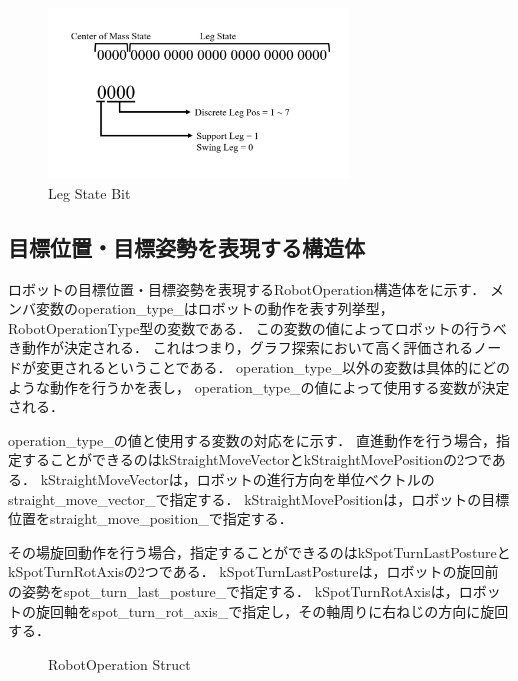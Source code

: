 \begin{figure}[htbp]
  \begin{center}
    \includegraphics[width=80mm, clip]{figure/chapter3/leg_state.png}
    \caption{Leg State Bit}
    \label{fig:leg_state_bit} %
  \end{center}
\end{figure}

\subsection{目標位置・目標姿勢を表現する構造体}
ロボットの目標位置・目標姿勢を表現するRobotOperation構造体をに示す．
メンバ変数のoperation\_type\_はロボットの動作を表す列挙型，RobotOperationType型の変数である．
この変数の値によってロボットの行うべき動作が決定される．
これはつまり，グラフ探索において高く評価されるノードが変更されるということである．
operation\_type\_以外の変数は具体的にどのような動作を行うかを表し，
operation\_type\_の値によって使用する変数が決定される．

operation\_type\_の値と使用する変数の対応をに示す．
直進動作を行う場合，指定することができるのはkStraightMoveVectorとkStraightMovePositionの2つである．
kStraightMoveVectorは，ロボットの進行方向を単位ベクトルのstraight\_move\_vector\_で指定する．
kStraightMovePositionは，ロボットの目標位置をstraight\_move\_position\_で指定する．

その場旋回動作を行う場合，指定することができるのはkSpotTurnLastPostureとkSpotTurnRotAxisの2つである．
kSpotTurnLastPostureは，ロボットの旋回前の姿勢をspot\_turn\_last\_posture\_で指定する．
kSpotTurnRotAxisは，ロボットの旋回軸をspot\_turn\_rot\_axis\_で指定し，その軸周りに右ねじの方向に旋回する．
\\

\begin{figure}[h]
  \centering
  \caption{RobotOperation Struct}
  \label{fig:robot_operation}  %
\end{figure}


